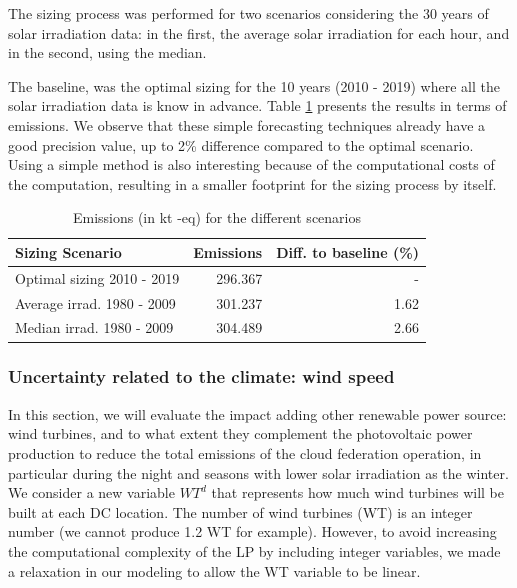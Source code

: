 The sizing process was performed for two scenarios considering the 30 years of solar irradiation data: in the first, the average solar irradiation for each hour, and in the second, using the median.

The baseline, was the optimal sizing for the 10 years (2010 - 2019) where all the solar irradiation data is know in advance.
Table \ref{tab:co2_10y} presents the results in terms of  emissions. We observe that these simple forecasting techniques already have a good precision value, up to 2\% difference compared to the optimal scenario. Using a simple method is also interesting because of the computational costs of the computation, resulting in a smaller  footprint for the sizing process by itself.

    \begin{table}
      
      \caption{Emissions (in kt -eq) for the different scenarios} \centering
    \label{tab:co2_10y}

      \begin{tabular}{|l|r|r|}
        
        \hline
        
        \textbf{Sizing Scenario} &  \textbf{Emissions } & \textbf{Diff. to baseline (\%) } \\
        \hline
        
        Optimal sizing 2010 - 2019  &       296.367 & - \\
        \hline     

        Average irrad.  1980 - 2009  & 301.237 &  1.62 \\
        \hline

        Median irrad. 1980 - 2009  &        304.489 & 2.66 \\
        \hline 
        
      \end{tabular}  
    \end{table}

  



\subsubsection{Uncertainty related to the climate: wind speed}

In this section, we will evaluate the impact adding other renewable power source: wind turbines, and to what extent they complement the photovoltaic power production to reduce the total emissions of the cloud federation operation, in particular during the night and seasons with lower solar irradiation as the winter. We consider a new variable $WT^d$ that represents how much wind turbines will be built at each DC location. The number of wind turbines (WT) is an integer number (we cannot produce 1.2 WT for example). However, to avoid increasing the computational complexity of the LP by including integer variables, we made a relaxation in our modeling to allow the WT variable to be linear. 

